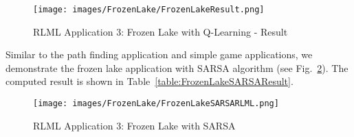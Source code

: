 \documentclass[11pt,letterpaper]{ryersonSGSThesis}
\begin{document}
\begin{ryersonSGSThesis}
    \begin{figure}[!tbh]
        \centering
        \texttt{[image: images/FrozenLake/FrozenLakeResult.png]}
        \caption{RLML Application 3: Frozen Lake with Q-Learning - Result}
        \label{fig:FrozenLakeResult}
    \end{figure}

    Similar to the path finding application and simple game applications, we demonstrate the frozen lake application with SARSA algorithm (see Fig.~\ref{fig:FrozenLakeSARSARLML}). The computed result is shown in Table~\ref{table:FrozenLakeSARSAResult}.
    
    \begin{figure}[!tbh]
        \centering
        \texttt{[image: images/FrozenLake/FrozenLakeSARSARLML.png]}
        \caption{RLML Application 3: Frozen Lake with SARSA}
        \label{fig:FrozenLakeSARSARLML}
    \end{figure}


\end{ryersonSGSThesis}
\end{document}
